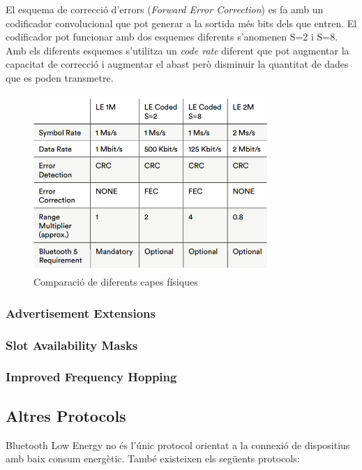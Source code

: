 El esquema de correcció d'errors (\textit{Forward Error Correction}) es fa amb un codificador convolucional que pot generar a la sortida més bits dels que entren. El codificador pot funcionar amb dos esquemes diferents s'anomenen S=2 i S=8.
Amb els diferents esquemes s'utilitza un \textit{code rate} diferent que pot augmentar la capacitat de correcció i augmentar el abast però disminuir la quantitat de dades que es poden transmetre.

\begin{figure}[h!]
	\begin{center}
		\includegraphics[width=0.8\textwidth]{./images/LE_PHY.png}
		\caption{Comparació de diferents capes físiques}
	\end{center}
\end{figure}

\subsubsection{Advertisement Extensions}
\subsubsection{Slot Availability Masks}
\subsubsection{Improved Frequency Hopping}


\subsection{Altres Protocols}
Bluetooth Low Energy no és l'únic protocol orientat a la connexió de dispositius amb baix consum energètic. També existeixen els següents protocols:

